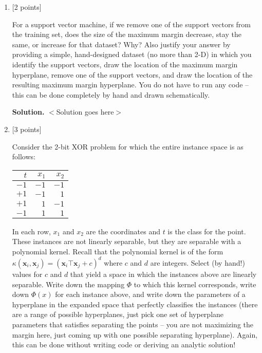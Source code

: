\documentclass[10pt]{article}
\begin{document}
\begin{enumerate}
{\bf Solution.} $<$Solution goes here$>$



\item {} [2 points]

For a support vector machine, if we remove one of the support vectors from the training set, does the size of the maximum margin decrease, stay the same, or increase for that dataset?  Why?  Also justify your answer by providing a simple, hand-designed dataset (no more than 2-D) in which you identify the support vectors, draw the location of the maximum margin hyperplane, remove one of the support vectors, and draw the location of the resulting maximum margin hyperplane.  You do not have to run any code -- this can be done completely by hand and drawn schematically.

{\bf Solution.} $<$Solution goes here$>$


\item {} [3 points]

Consider the 2-bit XOR problem for which the entire instance space is as follows:
\begin{table}[h!]
\centering
\begin{tabular}{|r|r|r|}
\hline
$t$ & $x_1$ & $x_2$ \\
\hline
$-1$ & $-1$ & $-1$ \\
$+1$ & $-1$ & $1$ \\
$+1$ & $1$ & $-1$ \\
$-1$ & $1$ & $1$ \\
\hline
\end{tabular}
\label{tab:myfirsttable}
\end{table}
In each row, $x_1$ and $x_2$ are the coordinates and $t$ is the class for the point.  These instances are not linearly separable, but they are separable with a polynomial kernel.  Recall that the polynomial kernel is of the form $\kappa (\mathbf{x}_i, \mathbf{x}_j) = (\mathbf{x}_i \top \mathbf{x}_j + c)^d$ where $c$ and $d$ are integers.  Select (by hand!) values for $c$ and $d$ that yield a space in which the instances above are linearly separable.  Write down the mapping $\Phi$ to which this kernel corresponds, write down ${\Phi}(x)$ for each instance above, and write down the parameters of a hyperplane in the expanded space that perfectly classifies the instances (there are a range of possible hyperplanes, just pick one set of hyperplane parameters that satisfies separating the points -- you are not maximizing the margin here, just coming up with one possible separating hyperplane).  Again, this can be done without writing code or deriving an analytic solution!


\end{enumerate}
\end{document}

